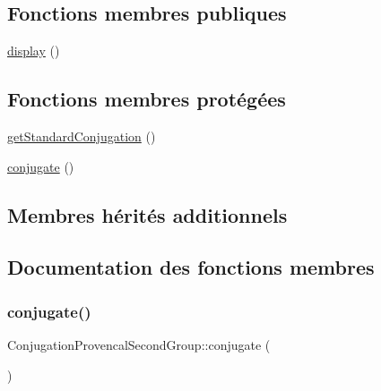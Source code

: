 \subsection*{Fonctions membres publiques}
\begin{DoxyCompactItemize}
\item 
\hyperlink{class_conjugation_provencal_second_group_a99d29b0ed4e0e8129dfff0ed94746c4f}{display} ()
\end{DoxyCompactItemize}
\subsection*{Fonctions membres protégées}
\begin{DoxyCompactItemize}
\item 
\hyperlink{class_conjugation_provencal_second_group_abe567700b32c8867ff9a5cd4d9777aec}{get\+Standard\+Conjugation} ()
\item 
\hyperlink{class_conjugation_provencal_second_group_a8e2552ef5ad24b15da6b0b294acf4ae1}{conjugate} ()
\end{DoxyCompactItemize}
\subsection*{Membres hérités additionnels}


\subsection{Documentation des fonctions membres}
\hypertarget{class_conjugation_provencal_second_group_a8e2552ef5ad24b15da6b0b294acf4ae1}{}\label{class_conjugation_provencal_second_group_a8e2552ef5ad24b15da6b0b294acf4ae1} 
\subsubsection{\texorpdfstring{conjugate()}{conjugate()}}
{\footnotesize\ttfamily Conjugation\+Provencal\+Second\+Group\+::conjugate (\begin{DoxyParamCaption}{ }\end{DoxyParamCaption})\hspace{0.3cm}{\ttfamily [protected]}}

\hypertarget{class_conjugation_provencal_second_group_a99d29b0ed4e0e8129dfff0ed94746c4f}{}\label{class_conjugation_provencal_second_group_a99d29b0ed4e0e8129dfff0ed94746c4f} 
